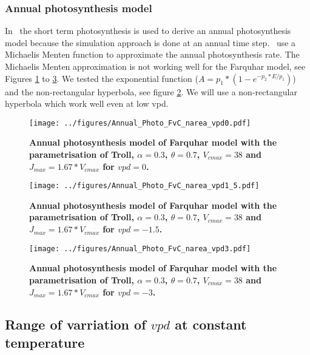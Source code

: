 \documentclass[a4paper,11pt]{article}
\begin{document}
\clearpage

\subsubsection{Annual photosynthesis model}

In \plant\ the short term photosynthesis is used to derive an annual
photosynthesis model because the simulation approach is done at an
annual time step. \plant\ use a Michaelis
Menten function to approximate the annual photosynthesis rate. The Michaelis Menten approximation
is not working well for the Farquhar model, see Figures
\ref{fig:photo_annu_fvc0} to \ref{fig:photo_annu_fvc3}. We tested the exponential
function \citep{Chen-2016} ($A = p_1 *(1-e^{-p_2* E/p_1})$) and the
non-rectangular hyperbola, see figure
\ref{fig:photo_annu_fvc15}. We will use a non-rectangular hyperbola
which work well even at low vpd.

\begin{figure}[ht]
\centering
\texttt{[image: ../figures/Annual\_Photo\_FvC\_narea\_vpd0.pdf]}
\caption{\textbf{Annual photosynthesis model of Farquhar model with
    the parametrisation of Troll, $\alpha = 0.3$, $\theta = 0.7$,
    $V_{cmax} = 38$ and $J_{max} = 1.67 * V_{cmax}$ for $ vpd = 0$.}
\label{fig:photo_annu_fvc0}}
\end{figure}

\begin{figure}[ht]
\centering
\texttt{[image: ../figures/Annual\_Photo\_FvC\_narea\_vpd1\_5.pdf]}
\caption{\textbf{Annual photosynthesis model of Farquhar model with
    the parametrisation of Troll, $\alpha = 0.3$, $\theta = 0.7$,
    $V_{cmax} = 38$ and $J_{max} = 1.67 * V_{cmax}$ for $vpd = -1.5$.}
\label{fig:photo_annu_fvc15}}
\end{figure}

\begin{figure}[ht]
\centering
\texttt{[image: ../figures/Annual\_Photo\_FvC\_narea\_vpd3.pdf]}
\caption{\textbf{Annual photosynthesis model of Farquhar model with
    the parametrisation of Troll, $\alpha = 0.3$, $\theta = 0.7$,
    $V_{cmax} = 38$ and $J_{max} = 1.67 * V_{cmax}$ for $vpd = -3$.}
\label{fig:photo_annu_fvc3}}
\end{figure}


\clearpage

\subsection{Range of varriation of $vpd$ at constant temperature}
\end{document}
